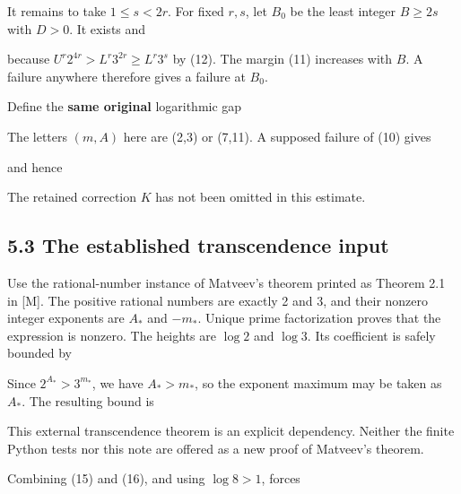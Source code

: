 It remains to take \(1\le s<2r\). For fixed \(r,s\), let \(B_0\) be the
least integer \(B\ge2s\) with \(D>0\). It exists and


because \(U^r2^{4r}>L^r3^{2r}\ge L^r3^s\) by (12). The margin (11)
increases with \(B\). A failure anywhere therefore gives a failure at
\(B_0\).

Define the \textbf{same original} logarithmic gap


The letters \((m,A)\) here are (2,3) or (7,11). A supposed failure of
(10) gives


and hence


The retained correction \(K\) has not been omitted in this estimate.

\subsection{5.3 The established transcendence input}

Use the rational-number instance of Matveev's theorem printed as Theorem
2.1 in {[}M{]}. The positive rational numbers are exactly 2 and 3, and
their nonzero integer exponents are \(A_*\) and \(-m_*\). Unique prime
factorization proves that the expression is nonzero. The heights are
\(\log2\) and \(\log3\). Its coefficient is safely bounded by


Since \(2^{A_*}>3^{m_*}\), we have \(A_*>m_*\), so the exponent maximum
may be taken as \(A_*\). The resulting bound is


This external transcendence theorem is an explicit dependency. Neither
the finite Python tests nor this note are offered as a new proof of
Matveev's theorem.

Combining (15) and (16), and using \(\log8>1\), forces


